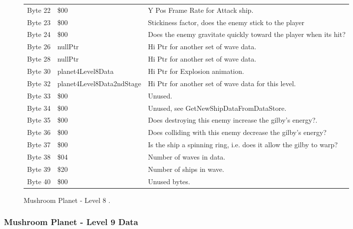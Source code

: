 \begin{figure}[H]
{\begin{adjustbox}{width=12cm}
\begin{tabular}{lll}
 Byte 22 & \$00                       & Y Pos Frame Rate for Attack ship.                                  \\
 Byte 23 & \$00                       & Stickiness factor, does the enemy stick to the player              \\
 Byte 24 & \$00                       & Does the enemy gravitate quickly toward the player when its hit?   \\
 Byte 26 & nullPtr                   & Hi Ptr for another set of wave data.                               \\
 Byte 28 & nullPtr                   & Hi Ptr for another set of wave data.                               \\
 Byte 30 & planet4Level8Data         & Hi Ptr for Explosion animation.                                    \\
 Byte 32 & planet4Level8Data2ndStage & Hi Ptr for another set of wave data for this level.                \\
 Byte 33 & \$00                       & Unused.                                                            \\
 Byte 34 & \$00                       & Unused, see GetNewShipDataFromDataStore.                           \\
 Byte 35 & \$00                       & Does destroying this enemy increase the gilby's energy?.           \\
 Byte 36 & \$00                       & Does colliding with this enemy decrease the gilby's energy?        \\
 Byte 37 & \$00                       & Is the ship a spinning ring, i.e. does it allow the gilby to warp? \\
 Byte 38 & \$04                       & Number of waves in data.                                           \\
 Byte 39 & \$20                       & Number of ships in wave.                                           \\
 Byte 40 & \$00                       & Unused bytes.                                                      \\
\bottomrule
\end{tabular}

  \end{adjustbox}

  }\caption*{Mushroom Planet - Level 8
.}
\end{figure}

\clearpage
\subsubsection{Mushroom Planet - Level 9 Data}

